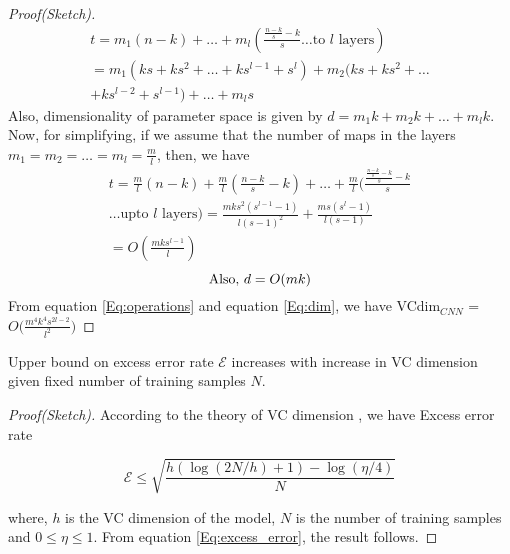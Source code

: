 \documentclass[11pt,a4paper]{article}
\begin{document}
\begin{proof}[Proof(Sketch)]
\begin{multline}
t = m_1(n-k) + \ldots + m_l(\frac{\frac{n-k}{s}-k}{s} \ldots \text{to $l$ layers})\\
= m_1(ks + ks^2 + \ldots + ks^{l-1} + s^l) + m_2(ks + ks^2 + \ldots \\
+ ks^{l-2} + s^{l-1}) + \ldots + m_ls
\end{multline}
Also, dimensionality of parameter space is given by $d = m_1k + m_2k + \ldots + m_lk $.
Now, for simplifying, if we assume that the number of maps in the layers $m_1 = m_2 = \ldots = m_l = \frac{m}{l}$, then, we have
\begin{multline}\label{Eq:operations}
t = \frac{m}{l}(n-k) + \frac{m}{l}(\frac{n-k}{s}-k) + \ldots + \frac{m}{l}(\frac{\frac{\frac{n-k}{s}-k}{s}-k}{s} \\ \ldots \text{upto $l$ layers})
= \frac{mks^2(s^{l-1}-1)}{l(s-1)^2} + \frac{ms(s^l-1)}{l(s-1)} \\= O(\frac{mks^{l-1}}{l})
\end{multline}
\begin{equation}\label{Eq:dim}
\text{Also, }\hfill d = O(mk)
\end{equation}
From equation \ref{Eq:operations} and equation \ref{Eq:dim}, we have VCdim$_{CNN}$ = $O\Big(\frac{m^4k^4s^{2l-2}}{l^2}\Big)$

\end{proof}

\begin{theorem}\label{Theorem:error_vc}
Upper bound on excess error rate $\mathcal{E}$ increases with increase in VC dimension given fixed number of training samples $N$.
\end{theorem}
\begin{proof}[Proof(Sketch)] According to the theory of VC dimension \cite{vapnik1996structure}, we have Excess error rate

\begin{equation}\label{Eq:excess_error}
\mathcal{E} \leq \sqrt{\frac{h(\log(2N/h)+1)-\log(\eta/4)}{N}} 
\end{equation}

where, $h$ is the VC dimension of the model, $N$ is the number of training samples and $0\leq\eta\leq1$. From equation \ref{Eq:excess_error}, the result follows.  
\end{proof}
\end{document}
